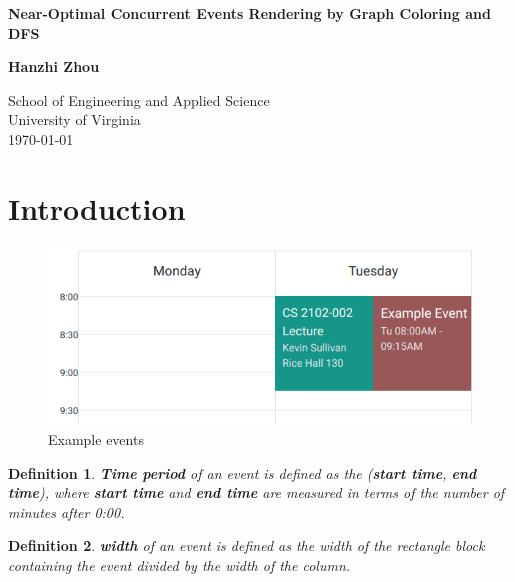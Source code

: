 \documentclass[12pt]{article}
\newtheorem{definition}{Definition}
\begin{document}
\begin{titlepage}
    \begin{center}
        \vspace*{1cm}
 
        \LARGE\textbf{Near-Optimal Concurrent Events Rendering by Graph Coloring and DFS}
   
        \vspace{1.5cm}
 
        \textbf{Hanzhi Zhou}
 
        \vfill
        \vspace{0.8cm}

        \Large
        School of Engineering and Applied Science\\
        \vspace{0.2cm}
        University of Virginia\\
        \vspace{0.2cm}
        \today
        \vspace{1cm}
    \end{center}
    \clearpage
\end{titlepage}

\section{Introduction}
\begin{figure}[H]
    \centering
    \includegraphics[width=.8\columnwidth]{example-event.png}
    \caption{Example events}
    \label{fig:ev-exp-1}
\end{figure}

\begin{definition}
    \textbf{Time period} of an event is defined as the (\textbf{start time}, \textbf{end time}), where \textbf{start time} and \textbf{end time} are measured in terms of the number of minutes after 0:00.
\end{definition}

\begin{definition}
    \textbf{width} of an event is defined as the width of the rectangle block containing the event divided by the width of the column. 
\end{definition}
\end{document}
